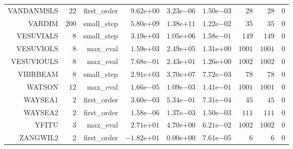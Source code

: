 \begin{longtable}{rrrrrrrrr}
VANDANMSLS & \(    22\) & first\_order & \( 9.62\)e\(+00\) & \( 3.23\)e\(-06\) & \( 1.50\)e\(-03\) & \(    28\) & \(    28\) & \(     0\) \\
VARDIM & \(   200\) & small\_step & \( 5.80\)e\(+09\) & \( 1.38\)e\(+11\) & \( 1.22\)e\(-02\) & \(    35\) & \(    35\) & \(     0\) \\
VESUVIALS & \(     8\) & small\_step & \( 3.19\)e\(+03\) & \( 1.05\)e\(+06\) & \( 1.58\)e\(-01\) & \(   149\) & \(   149\) & \(     0\) \\
VESUVIOLS & \(     8\) & max\_eval & \( 1.59\)e\(+03\) & \( 2.49\)e\(+05\) & \( 1.31\)e\(+00\) & \(  1001\) & \(  1001\) & \(     0\) \\
VESUVIOULS & \(     8\) & max\_eval & \( 7.68\)e\(-01\) & \( 2.43\)e\(+01\) & \( 1.26\)e\(+00\) & \(  1002\) & \(  1002\) & \(     0\) \\
VIBRBEAM & \(     8\) & small\_step & \( 2.91\)e\(+03\) & \( 3.70\)e\(+07\) & \( 7.72\)e\(-03\) & \(    78\) & \(    78\) & \(     0\) \\
WATSON & \(    12\) & max\_eval & \( 1.66\)e\(-05\) & \( 1.09\)e\(-03\) & \( 1.41\)e\(-01\) & \(  1001\) & \(  1001\) & \(     0\) \\
WAYSEA1 & \(     2\) & first\_order & \( 3.60\)e\(-03\) & \( 5.34\)e\(-01\) & \( 7.31\)e\(-04\) & \(    45\) & \(    45\) & \(     0\) \\
WAYSEA2 & \(     2\) & first\_order & \( 1.58\)e\(-06\) & \( 1.37\)e\(-03\) & \( 1.50\)e\(-03\) & \(   111\) & \(   111\) & \(     0\) \\
YFITU & \(     3\) & max\_eval & \( 2.71\)e\(+01\) & \( 4.70\)e\(+00\) & \( 6.21\)e\(-02\) & \(  1002\) & \(  1002\) & \(     0\) \\
ZANGWIL2 & \(     2\) & first\_order & \(-1.82\)e\(+01\) & \( 0.00\)e\(+00\) & \( 7.61\)e\(-05\) & \(     6\) & \(     6\) & \(     0\) \\\hline
\end{longtable}
